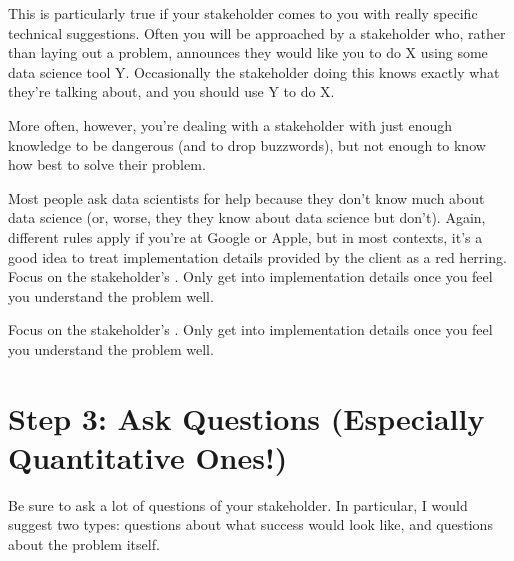 \documentclass[letterpaper,10pt,english]{jupyterBook}
\begin{document}
\sphinxAtStartPar
This is particularly true if your stakeholder comes to you with really specific technical suggestions. Often you will be approached by a stakeholder who, rather than laying out a problem, announces they would like you to do X using some data science tool Y. Occasionally the stakeholder doing this knows exactly what they’re talking about, and you should use Y to do X.

\sphinxAtStartPar
More often, however, you’re dealing with a stakeholder with just enough knowledge to be dangerous (and to drop buzzwords), but not enough to know how best to solve their problem.

\sphinxAtStartPar
Most people ask data scientists for help because they don’t know much about data science (or, worse, they  they know about data science but don’t). Again, different rules apply if you’re at Google or Apple, but in most contexts, it’s a good idea to treat implementation details provided by the client as a red herring. Focus on the stakeholder’s . Only get into implementation details once you feel you understand the problem well.

\begin{sphinxShadowBox}

\sphinxAtStartPar
Focus on the stakeholder’s . Only get into implementation details once you feel you understand the problem well.
\end{sphinxShadowBox}


\section{Step 3: Ask Questions (Especially Quantitative Ones!)}
\label{\detokenize{20_problems_to_questions/20_stakeholder_management:step-3-ask-questions-especially-quantitative-ones}}
\sphinxAtStartPar
Be sure to ask a lot of questions of your stakeholder. In particular, I would suggest two types: questions about what success would look like, and questions about the problem itself.
\end{document}
